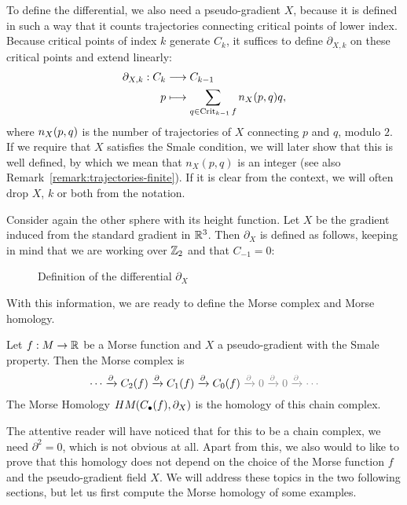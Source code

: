 To define the differential, we also need a pseudo-gradient $X$, because it is defined in such a way that it counts trajectories connecting critical points of lower index.
Because critical points of index $k$ generate $C_k$, it suffices to define $\partial_{X,k}$ on these critical points and extend linearly:
\begin{align*}
    \partial_{X, k}: C_k &\longrightarrow C_{k-1} \\
    p &\longmapsto \sum_{q \in \operatorname{Crit}_{k-1} f} n_{X}(p, q) q
,\end{align*}
where $n_{X}(p, q)$ is the number of trajectories of $X$ connecting $p$ and $q$, modulo $2$.
If we require that $X$ satisfies the Smale condition, we will later show that this is well defined, by which we mean that $n_X(p,q)$ is an integer (see also Remark~\ref{remark:trajectories-finite}).
If it is clear from the context, we will often drop $X$, $k$ or both from the notation.
\begin{eg}
    Consider again the other sphere with its height function.
    Let $X$ be the gradient induced from the standard gradient in $\mathbb{R}^3$.
    Then $\partial_X$ is defined as follows, keeping in mind that we are working over $\mathbb{Z}_2$ and that $C_{-1} = 0$:
\begin{figure}[H]
    \centering
    \caption{Definition of the differential $\partial_X$}
    \label{fig:morse-homology-other-sphere-differential}
\end{figure}
\end{eg}

With this information, we are ready to define the Morse complex and Morse homology.
\begin{definition}
    Let $f:M \to \mathbb{R}$ be a Morse function and $X$ a pseudo-gradient with the Smale property.
    Then the Morse complex is 
    \[
        \cdots \xrightarrow{\partial} C_2(f) \xrightarrow{\partial}  C_1(f) \xrightarrow{\partial} C_0(f) \textcolor{gray}{{} \xrightarrow{\partial}  0 \xrightarrow{\partial }0 \xrightarrow{\partial}  \cdots}
    \] 
    The Morse Homology $HM_{}(C_\bullet(f), \partial_X)$ is the homology of this chain complex.
\end{definition}
The attentive reader will have noticed that for this to be a chain complex, we need $\partial^2 = 0$, which is not obvious at all.
Apart from this, we also would to like to prove that  this homology does not depend on the choice of the Morse function $f$ and the pseudo-gradient field $X$.
We will address these topics in the two following sections, but let us first compute the Morse homology of some examples.


